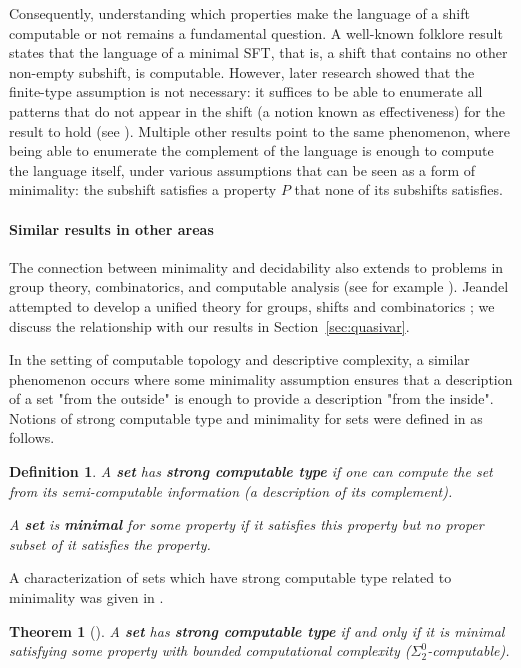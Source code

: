 \documentclass[french,american]{article}
\theoremstyle{plain}
\theoremstyle{definition}
\theoremstyle{remark}
\theoremstyle{plain}
\newtheorem*{definition*}{Definition}
\newtheorem*{theorem*}{Theorem}
\begin{document}
Consequently, understanding which properties
make the language of a shift computable or not remains a fundamental question.
A well-known folklore result states that the language of a minimal
SFT, that is, a shift that contains no other non-empty subshift, is computable. However, later research showed that the finite-type
assumption is not necessary: it suffices to be able to enumerate all
patterns that do not appear in the shift (a notion known as effectiveness)
for the result to hold (see \cite{jeandel2019characterization,jeandel2017enumeration,delvenneblondel}).
Multiple other results point to the same phenomenon, where being
able to enumerate the complement of the language is enough to compute
the language itself, under various assumptions that can be seen as a form of minimality: the subshift satisfies a property $P$ that none of its subshifts satisfies.

\paragraph*{Similar results in other areas}

The connection between minimality and decidability also extends to
problems in group theory, combinatorics, and computable analysis (see
for example \cite{higman1961subgroups,lyndon1977combinatorial,Miller02}).
Jeandel attempted to develop a unified theory for groups, shifts and
combinatorics \cite{jeandel2017enumeration}; we discuss the relationship with our results in Section~\ref{sec:quasivar}.

In the setting of computable topology and descriptive complexity, a similar
phenomenon occurs where some minimality assumption ensures that a description of a set "from the outside"
is enough to provide a description "from the inside". Notions of strong computable type and minimality for sets were defined
in \cite{AH22c} as follows.
\begin{definition*}
A \textbf{set }has \textbf{strong computable type} if one can compute
the set from its semi-computable information (a description of its complement).

A \textbf{set} is \textbf{minimal} for some property if it satisfies
this property but no proper subset of it satisfies the property. 
\end{definition*}
A characterization of sets which have strong computable type related
to minimality was given in \cite{AH22c}.
\begin{theorem*}[\cite{AH22c}]
A \textbf{set} has \textbf{strong computable type} if and only if
it is minimal satisfying some property with bounded computational complexity ($\Sigma_2^0$-computable).
\end{theorem*}
\end{document}
